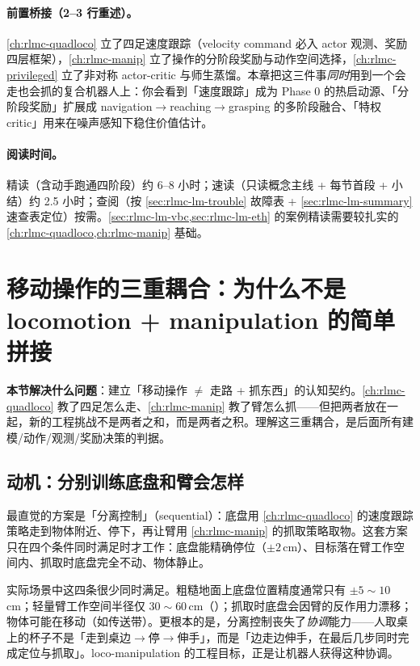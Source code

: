 \paragraph{前置桥接（2--3 行重述）。}\cref{ch:rlmc-quadloco} 立了四足速度跟踪（velocity command 必入 actor 观测、奖励四层框架），\cref{ch:rlmc-manip} 立了操作的分阶段奖励与动作空间选择，\cref{ch:rlmc-privileged} 立了非对称 actor-critic 与师生蒸馏。本章把这三件事\emph{同时}用到一个会走也会抓的复合机器人上：你会看到「速度跟踪」成为 Phase 0 的热启动源、「分阶段奖励」扩展成 navigation$\to$reaching$\to$grasping 的多阶段融合、「特权 critic」用来在噪声感知下稳住价值估计。

\paragraph{阅读时间。}精读（含动手跑通四阶段）约 6--8 小时；速读（只读概念主线 + 每节首段 + 小结）约 2.5 小时；查阅（按 \cref{sec:rlmc-lm-trouble} 故障表 + \cref{sec:rlmc-lm-summary} 速查表定位）按需。\cref{sec:rlmc-lm-vbc,sec:rlmc-lm-eth} 的案例精读需要较扎实的 \cref{ch:rlmc-quadloco,ch:rlmc-manip} 基础。

\section{移动操作的三重耦合：为什么不是 locomotion + manipulation 的简单拼接}
\label{sec:rlmc-lm-coupling}

\textbf{本节解决什么问题}：建立「移动操作 $\neq$ 走路 + 抓东西」的认知契约。\cref{ch:rlmc-quadloco} 教了四足怎么走、\cref{ch:rlmc-manip} 教了臂怎么抓——但把两者放在一起，新的工程挑战不是两者之和，而是两者之积。理解这三重耦合，是后面所有建模/动作/观测/奖励决策的判据。

\subsection{动机：分别训练底盘和臂会怎样}
\label{sec:rlmc-lm-motivation}

最直觉的方案是「分离控制」（sequential）：底盘用 \cref{ch:rlmc-quadloco} 的速度跟踪策略走到物体附近、停下，再让臂用 \cref{ch:rlmc-manip} 的抓取策略取物。这套方案只在四个条件同时满足时才工作：底盘能精确停位（$\pm2\,$cm）、目标落在臂工作空间内、抓取时底盘完全不动、物体静止。

实际场景中这四条很少同时满足。粗糙地面上底盘位置精度通常只有 $\pm5\!\sim\!10\,$cm；轻量臂工作空间半径仅 $30\!\sim\!60\,$cm（）；抓取时底盘会因臂的反作用力漂移；物体可能在移动（如传送带）。更根本的是，分离控制丧失了\emph{协调}能力——人取桌上的杯子不是「走到桌边$\to$停$\to$伸手」，而是「边走边伸手，在最后几步同时完成定位与抓取」。loco-manipulation 的工程目标，正是让机器人获得这种协调。

